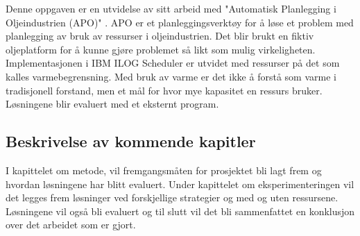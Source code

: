 Denne oppgaven er en utvidelse av \bht sitt arbeid med "Automatisk Planlegging i Oljeindustrien (APO)" \cite{tvedtbezem}. APO er et planleggingsverktøy for å løse et problem med planlegging av bruk av ressurser i oljeindustrien. Det blir brukt en fiktiv oljeplatform for å kunne gjøre problemet så likt som mulig virkeligheten. Implementasjonen i IBM ILOG Scheduler er utvidet med ressurser på det som kalles varmebegrensning. Med bruk av varme er det ikke å forstå som varme i tradisjonell forstand, men et mål for hvor mye kapasitet en ressurs bruker. Løsningene blir evaluert med et eksternt program.

\subsection{Beskrivelse av kommende kapitler}
I kapittelet om metode, vil fremgangsmåten for prosjektet bli lagt frem og hvordan løsningene har blitt evaluert. Under kapittelet om eksperimenteringen vil det legges frem løsninger ved forskjellige strategier og med og uten ressursene. Løsningene vil også bli evaluert og til slutt vil det bli sammenfattet en konklusjon over det arbeidet som er gjort.